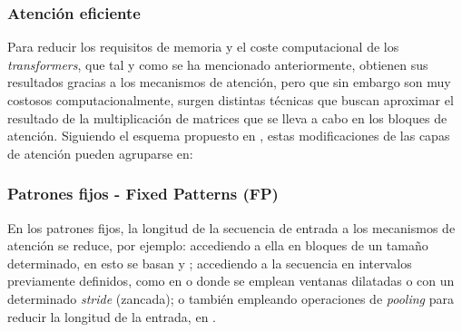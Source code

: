 \subsubsection{Atención eficiente}



Para reducir los requisitos de memoria y el coste computacional de los \textit{transformers}, que tal y como se ha mencionado anteriormente, obtienen sus resultados gracias a los mecanismos de atención, pero que sin embargo son muy costosos computacionalmente, surgen distintas técnicas que buscan aproximar el resultado de la multiplicación de matrices que se lleva a cabo en los bloques de atención. Siguiendo el esquema propuesto en \cite{2020arXiv200906732T}, estas modificaciones de las capas de atención pueden agruparse en:


\subsubsection{Patrones fijos - Fixed Patterns (FP)}
En los patrones fijos, la longitud de la secuencia de entrada a los mecanismos de atención se reduce, por ejemplo: accediendo a ella en bloques de un tamaño determinado, en esto se basan  \cite{qiu-etal-2020-blockwise} y  \cite{localattention}; accediendo a la secuencia en intervalos previamente definidos, como en  \cite{sparse-transformers} o  \cite{beltagy2020longformer} donde se emplean ventanas dilatadas o con un determinado \textit{stride} (zancada); o también empleando operaciones de \textit{pooling} para reducir la longitud de la entrada, en  \cite{j.2018generating}.


